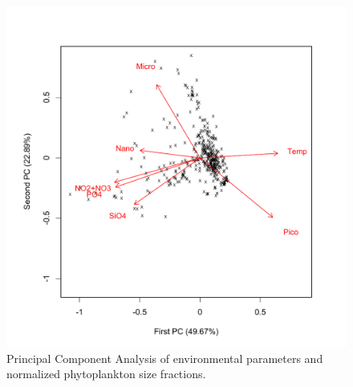 \begin{figure}
\centering
\includegraphics[trim = 0mm 0mm 0mm 0mm, clip, width=0.9\linewidth]{./Chp2-Pre/amt_PrinComp.pdf}
\caption[Scheme]{\small {Principal Component Analysis of environmental parameters and normalized phytoplankton size fractions.}}
\label{PrinComp}
\end{figure}

